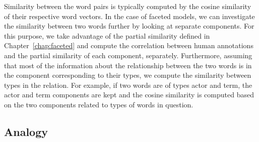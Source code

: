 Similarity between the word pairs is typically computed by the cosine similarity of their respective word vectors. In the case of faceted models, we can investigate the similarity between two words further by looking at separate components. For this purpose, we take advantage of the partial similarity defined in Chapter~\ref{chap:faceted} and compute the correlation between human annotations and the partial similarity of each component, separately. Furthermore, assuming that most of the information about the relationship between the two words is in the component corresponding to their types, we compute the similarity between types in the relation. For example, if two words are of types actor and term, the actor and term components are kept and the cosine similarity is computed based on the two components related to types of words in question. 
\subsection{Analogy}


